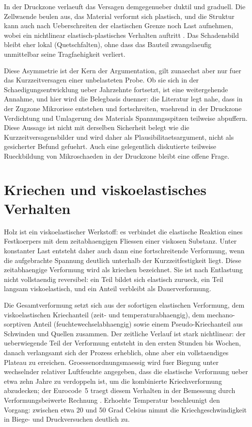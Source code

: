 In der Druckzone verlaeuft das Versagen demgegenueber duktil und graduell. Die
Zellwaende beulen aus, das Material verformt sich plastisch, und die Struktur
kann auch nach Ueberschreiten der elastischen Grenze noch Last aufnehmen,
wobei ein nichtlinear elastisch-plastisches Verhalten auftritt
\parencite{doitpoms}. Das Schadensbild bleibt eher lokal (Quetschfalten),
ohne dass das Bauteil zwangslaeufig unmittelbar seine Tragfaehigkeit verliert.

Diese Asymmetrie ist der Kern der Argumentation, gilt zunaechst aber nur fuer
das Kurzzeitversagen einer unbelasteten Probe. Ob sie sich in der
Schaedigungsentwicklung ueber Jahrzehnte fortsetzt, ist eine weitergehende
Annahme, und hier wird die Belegbasis duenner: die Literatur legt nahe, dass in
der Zugzone Mikrorisse entstehen und fortschreiten, waehrend in der Druckzone
Verdichtung und Umlagerung des Materials Spannungsspitzen teilweise abpuffern.
Diese Aussage ist nicht mit derselben Sicherheit belegt wie die
Kurzzeitversagensbilder und wird daher als Plausibilitaetsargument, nicht als
gesicherter Befund gefuehrt. Auch eine gelegentlich diskutierte teilweise
Rueckbildung von Mikroschaeden in der Druckzone bleibt eine offene Frage.

\section{Kriechen und viskoelastisches Verhalten}
\label{sec:kriechen}

Holz ist ein viskoelastischer Werkstoff: es verbindet die elastische Reaktion
eines Festkoerpers mit dem zeitabhaengigen Fliessen einer viskosen Substanz.
Unter konstanter Last entsteht daher auch dann eine fortschreitende Verformung,
wenn die aufgebrachte Spannung deutlich unterhalb der Kurzzeitfestigkeit liegt.
Diese zeitabhaengige Verformung wird als \gls{kriechen} bezeichnet. Sie ist nach
Entlastung nicht vollstaendig reversibel: ein Teil bildet sich elastisch
zurueck, ein Teil langsam viskoelastisch, und ein Anteil verbleibt als
Dauerverformung.

Die Gesamtverformung setzt sich aus der sofortigen elastischen Verformung, dem
viskoelastischen Kriechanteil (zeit- und temperaturabhaengig), dem
mechano-sorptiven Anteil (feuchtewechselabhaengig) sowie einem
Pseudo-Kriechanteil aus Schwinden und Quellen zusammen. Der zeitliche Verlauf
ist stark nichtlinear: der ueberwiegende Teil der Verformung entsteht in den
ersten Stunden bis Wochen, danach verlangsamt sich der Prozess erheblich, ohne
aber ein vollstaendiges Plateau zu erreichen. Groessenordnungsmaessig wird fuer
Biegung unter wechselnder relativer Luftfeuchte angegeben, dass die elastische
Verformung ueber etwa zehn Jahre zu verdoppeln ist, um die kombinierte
Kriechverformung abzudecken; der Eurocode~5 traegt diesem Verhalten in der
Bemessung durch Verformungsbeiwerte Rechnung \parencite{ec5}. Erhoehte
Temperatur beschleunigt den Vorgang: zwischen etwa 20 und 50 Grad Celsius nimmt
die Kriechgeschwindigkeit in Biege- und Druckversuchen deutlich zu.

